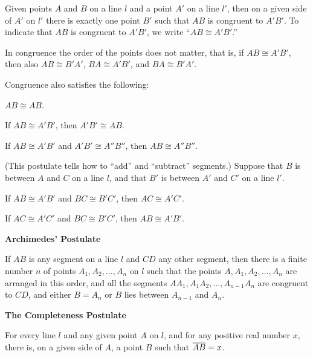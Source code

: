 \documentclass[11pt]{book}
\newcommand{\APPsub}[1]{%
  \par\medskip\begin{center}\bfseries\small #1\end{center}\par\nopagebreak}
\begin{document}
\begin{applist}[resume]
\item Given points $A$ and $B$ on a line $l$ and a point $A'$ on a line
      $l'$, then on a given side of $A'$ on $l'$ there is exactly one point
      $B'$ such that $AB$ is congruent to $A'B'$. To indicate that $AB$ is
      congruent to $A'B'$, we write ``$AB \cong A'B'$.''

      In congruence the order of the points does not matter, that is, if
      $AB \cong A'B'$, then also $AB \cong B'A'$, $BA \cong A'B'$, and
      $BA \cong B'A'$.
\item Congruence also satisfies the following:
      \begin{applist}
      \item $AB \cong AB$.
      \item If $AB \cong A'B'$, then $A'B' \cong AB$.
      \item If $AB \cong A'B'$ and $A'B' \cong A''B''$, then
            $AB \cong A''B''$.
      \end{applist}
\item (This postulate tells how to ``add'' and ``subtract'' segments.)
      Suppose that $B$ is between $A$ and $C$ on a line $l$, and that $B'$
      is between $A'$ and $C'$ on a line $l'$.
      \begin{applist}
      \item If $AB \cong A'B'$ and $BC \cong B'C'$, then $AC \cong A'C'$.
      \item If $AC \cong A'C'$ and $BC \cong B'C'$, then $AB \cong A'B'$.
      \end{applist}
\end{applist}

\APPsub{Archimedes' Postulate}

\begin{applist}[resume]
\item If $AB$ is any segment on a line $l$ and $CD$ any other segment, then
      there is a finite number $n$ of points $A_1, A_2, \ldots, A_n$ on $l$
      such that the points $A, A_1, A_2, \ldots, A_n$ are arranged in this
      order, and all the segments $AA_1, A_1A_2, \ldots, A_{n-1}A_n$ are
      congruent to $CD$, and either $B = A_n$ or $B$ lies between $A_{n-1}$
      and $A_n$.
\end{applist}

\APPsub{The Completeness Postulate}

\begin{applist}[resume]
\item For every line $l$ and any given point $A$ on $l$, and for any
      positive real number $x$, there is, on a given side of $A$, a point
      $B$ such that $\overline{AB} = x$.
\end{applist}
\end{document}
